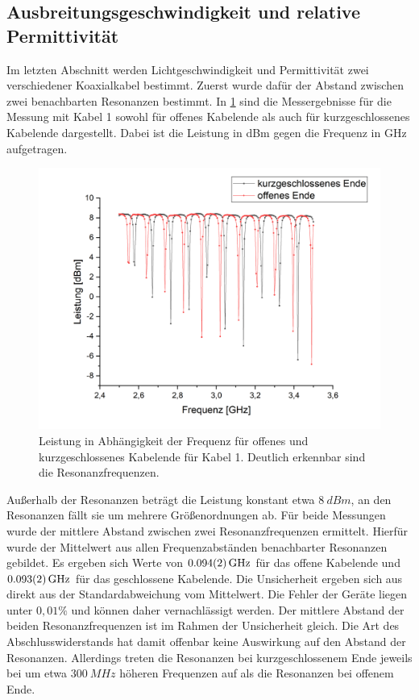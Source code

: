 \subsection{Ausbreitungsgeschwindigkeit und relative Permittivität}
Im letzten Abschnitt werden Lichtgeschwindigkeit und Permittivität zwei verschiedener Koaxialkabel bestimmt. Zuerst wurde dafür der Abstand zwischen zwei benachbarten Resonanzen bestimmt. In \cref{gleich} sind die Messergebnisse für die Messung mit Kabel 1 sowohl für offenes Kabelende als auch für kurzgeschlossenes Kabelende dargestellt. Dabei ist die Leistung in dBm gegen die Frequenz in GHz aufgetragen.

\begin{figure}[h]
	\centering
	\includegraphics[scale=0.7]{gleiches_Kabel.png}
	\caption{Leistung in Abhängigkeit der Frequenz für offenes und kurzgeschlossenes Kabelende für Kabel 1. Deutlich erkennbar sind die Resonanzfrequenzen.}
	\label{gleich}
\end{figure}

Außerhalb der Resonanzen beträgt die Leistung konstant etwa $\SI{8}{dBm}$, an den Resonanzen fällt sie um mehrere Größenordnungen ab. Für beide Messungen wurde der mittlere Abstand zwischen zwei Resonanzfrequenzen ermittelt. Hierfür wurde der Mittelwert aus allen Frequenzabständen benachbarter Resonanzen gebildet. Es ergeben sich Werte von $\SI{0,094\pm0,002}{GHz}$ für das offene Kabelende und $\SI{0,093\pm0,002}{GHz}$ für das geschlossene Kabelende. Die Unsicherheit ergeben sich aus direkt aus der Standardabweichung vom Mittelwert. Die Fehler der Geräte liegen unter $0,01\%$ und können daher vernachlässigt werden. Der mittlere Abstand der beiden Resonanzfrequenzen ist im Rahmen der Unsicherheit gleich. Die Art des Abschlusswiderstands hat damit offenbar keine Auswirkung auf den Abstand der Resonanzen. Allerdings treten die Resonanzen bei kurzgeschlossenem Ende jeweils bei um etwa $\SI{300}{MHz}$ höheren Frequenzen auf als die Resonanzen bei offenem Ende.

